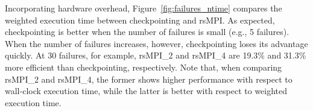 Incorporating hardware overhead, Figure~\ref{fig:failures_ntime} compares the weighted execution time between checkpointing and rsMPI.  As expected, checkpointing is better when the number of  failures is small (e.g., 5 failures).  When the number of failures increases,  however, checkpointing loses its advantage quickly. At 30 failures, for example, rsMPI\_2 and rsMPI\_4 are 19.3\% and 31.3\% more efficient than  checkpointing, respectively.
Note that, when comparing rsMPI\_2 and rsMPI\_4, the former shows higher performance with respect to wall-clock execution time, while the latter is better with respect to weighted execution time. 
